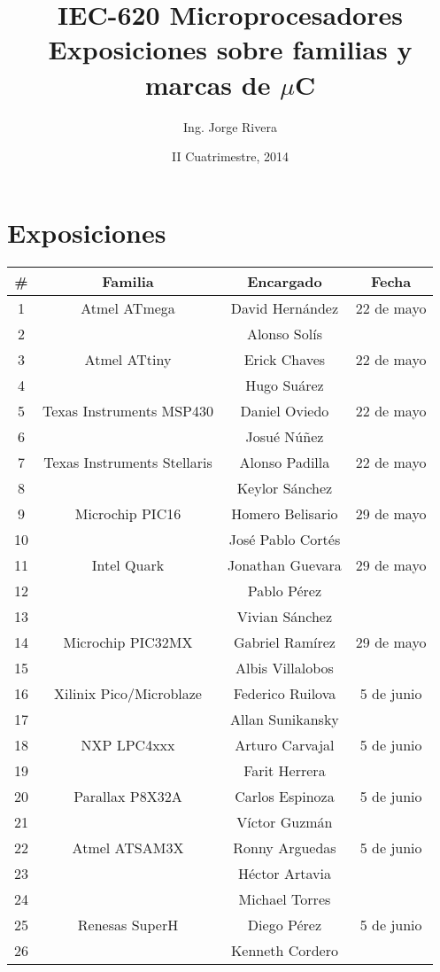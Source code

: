 \documentclass[letterpaper,10pt]{article}
\title{IEC-620 Microprocesadores\\ Exposiciones sobre familias y marcas de $\mu$C}
\author{Ing. Jorge Rivera}
\date{II Cuatrimestre, 2014}
\begin{document}
\maketitle

\section{Exposiciones}

\begin{center}
\begin{tabular}{|c|c|c|c|}\hline
\#  & Familia 					& Encargado				& Fecha  \\ \hline\hline
1   & Atmel ATmega 			 	& David Hernández	& 22 de mayo\\
2   & 					 		& Alonso Solís		& 	\\\hline
3   & Atmel ATtiny		 		& Erick Chaves  	& 22 de mayo	\\
4   &  				 			& Hugo Suárez		& 	\\\hline
5   & Texas Instruments MSP430	& Daniel Oviedo		& 22 de mayo	\\
6   &     						& Josué Núñez		& \\\hline
7   & Texas Instruments Stellaris & Alonso Padilla	& 22 de mayo	\\
8   & 							& Keylor Sánchez	& \\\hline
9   & Microchip PIC16 			& Homero Belisario	& 29 de mayo		\\
10  & 							& José Pablo Cortés	& \\ \hline
11  & Intel Quark				& Jonathan Guevara  & 29 de mayo		\\
12  & 							& Pablo Pérez		& 	\\
13  & 							& Vivian Sánchez	& 		\\\hline
14  & Microchip PIC32MX			& Gabriel Ramírez 	& 29 de mayo	\\
15  & 							& Albis Villalobos	& 		\\\hline
16  & Xilinix Pico/Microblaze	& Federico Ruilova	& 5 de junio	\\
17  & 							& Allan Sunikansky	&  	\\\hline
18  & NXP LPC4xxx				& Arturo Carvajal	& 5 de junio\\
19  & 							& Farit Herrera		& 		\\\hline
20  & Parallax P8X32A			& Carlos Espinoza	& 5 de junio\\
21  &							& Víctor Guzmán		& 		\\\hline
22  & Atmel ATSAM3X & Ronny Arguedas  & 5 de junio\\
23  & & Héctor Artavia &\\ 
24  & & Michael Torres &\\ \hline
25  & Renesas SuperH& Diego Pérez & 5 de junio\\
26 & & Kenneth Cordero &\\\hline

\end{tabular}
\end{center}
\end{document}
